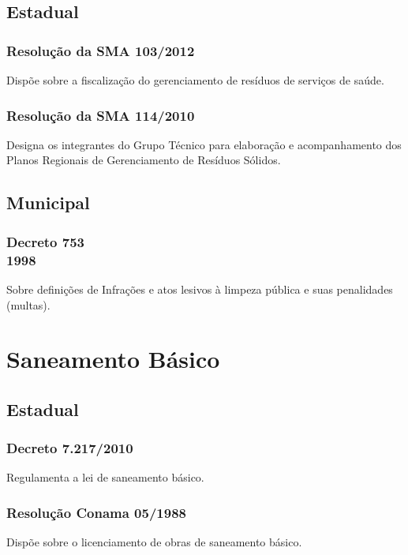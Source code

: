 \begin{subapend}
	\subsection{Estadual}
	\begin{subsubapend}
		\item \subsubsection{Resolução da SMA 103/2012}
		Dispõe sobre a fiscalização do gerenciamento de resíduos de serviços de saúde.
		\subsubsection{Resolução da SMA 114/2010}
		Designa os integrantes do Grupo Técnico para elaboração e acompanhamento dos Planos Regionais de Gerenciamento de Resíduos Sólidos.
		\subsection{Municipal}
		\subsubsection{Decreto 753\\1998}
		Sobre definições de Infrações e atos lesivos à limpeza pública e suas penalidades (multas).
	\end{subsubapend}
\end{subapend}



\section{Saneamento Básico}

\begin{subapend}
	\subsection{Estadual}
	\begin{subsubapend}
		\item \subsubsection{Decreto 7.217/2010}
		Regulamenta a lei de saneamento básico.
		\subsubsection{Resolução Conama 05/1988}
		Dispõe sobre o licenciamento de obras de saneamento básico.
	\end{subsubapend}
\end{subapend}
